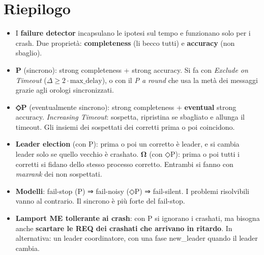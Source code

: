 \section{Riepilogo}

\begin{itemize}
\tightlist
\item
  I \textbf{failure detector} incapsulano le ipotesi sul tempo e funzionano solo per i crash. Due proprietà: \textbf{completeness} (li becco tutti) e \textbf{accuracy} (non sbaglio).
\item
  \textbf{P} (sincrono): strong completeness + strong accuracy. Si fa con \emph{Exclude on Timeout} (\(\Delta \ge 2 \cdot \text{max\_delay}\)), o con il \emph{P a round} che usa la metà dei messaggi grazie agli orologi sincronizzati.
\item
  \textbf{◇P} (eventualmente sincrono): strong completeness + \textbf{eventual} strong accuracy. \emph{Increasing Timeout}: sospetta, ripristina se sbagliato e allunga il timeout. Gli insiemi dei sospettati dei corretti prima o poi coincidono.
\item
  \textbf{Leader election} (con P): prima o poi un corretto è leader, e si cambia leader solo se quello vecchio è crashato. \textbf{Ω} (con ◇P): prima o poi tutti i corretti si fidano dello stesso processo corretto. Entrambi si fanno con \emph{maxrank} dei non sospettati.
\item
  \textbf{Modelli}: fail-stop (P) ⇒ fail-noisy (◇P) ⇒ fail-silent. I problemi risolvibili vanno al contrario. Il sincrono è più forte del fail-stop.
\item
  \textbf{Lamport ME tollerante ai crash}: con P si ignorano i crashati, ma bisogna anche \textbf{scartare le REQ dei crashati che arrivano in ritardo}. In alternativa: un leader coordinatore, con una fase new\_leader quando il leader cambia.
\end{itemize}
